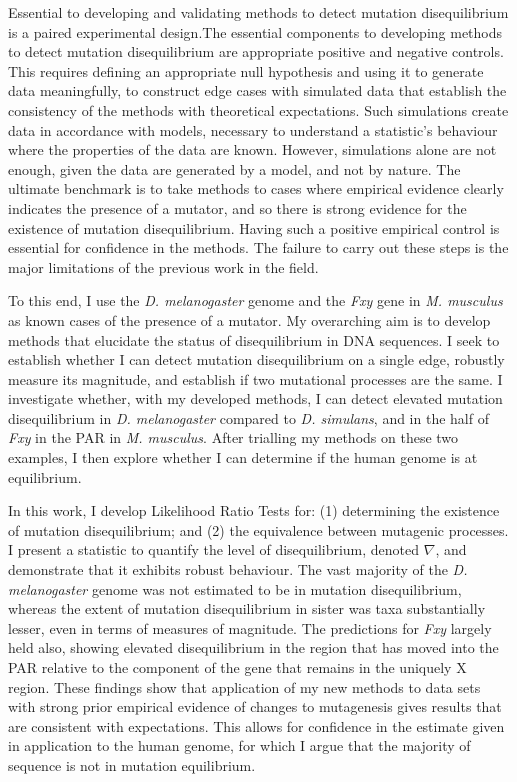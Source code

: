 Essential to developing and validating methods to detect mutation disequilibrium is a paired experimental design.The essential components to developing methods to detect mutation disequilibrium are appropriate positive and negative controls. This requires defining an appropriate null hypothesis and using it to generate data meaningfully, to construct edge cases with simulated data that establish the consistency of the methods with theoretical expectations. Such simulations create data in accordance with models, necessary to understand a statistic's behaviour where the properties of the data are known. However, simulations alone are not enough, given the data are generated by a model, and not by nature. The ultimate benchmark is to take methods to cases where empirical evidence clearly indicates the presence of a mutator, and so there is strong evidence for the existence of mutation disequilibrium. Having such a positive empirical control is essential for confidence in the methods. The failure to carry out these steps is the major limitations of the previous work in the field. 

To this end, I use the \textit{D. melanogaster} genome and the \textit{Fxy} gene in \textit{M. musculus} as known cases of the presence of a mutator. My overarching aim is to develop methods that elucidate the status of disequilibrium in DNA sequences. I seek to establish whether I can detect mutation disequilibrium on a single edge, robustly measure its magnitude, and establish if two mutational processes are the same. I investigate whether, with my developed methods, I can detect elevated mutation disequilibrium in \textit{D. melanogaster} compared to \textit{D. simulans}, and in the half of \textit{Fxy} in the PAR in \textit{M. musculus}. After trialling my methods on these two examples, I then explore whether I can determine if the human genome is at equilibrium.

In this work, I develop Likelihood Ratio Tests for: (1) determining the existence of mutation disequilibrium; and (2) the equivalence between mutagenic processes. I present a statistic to quantify the level of disequilibrium, denoted $\nabla$, and demonstrate that it exhibits robust behaviour. The vast majority of the \textit{D. melanogaster} genome was not estimated to be in mutation disequilibrium, whereas the extent of mutation disequilibrium in sister was taxa substantially lesser, even in terms of measures of magnitude. The predictions for \textit{Fxy} largely held also, showing elevated disequilibrium in the region that has moved into the PAR relative to the component of the gene that remains in the uniquely X region. These findings show that application of my new methods to data sets with strong prior empirical evidence of changes to mutagenesis gives results that are consistent with expectations. This allows for confidence in the estimate given in application to the human genome, for which I argue that the majority of sequence is not in mutation equilibrium. 